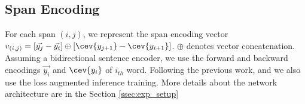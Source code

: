 \subsection{Span Encoding}
\label{ssec:phr:span}

For each span $(i,j)$, we represent the span encoding vector
$v_{(i,j)} = [\vec{y_{j}} - \vec{y_{i}}] \oplus [\cev{y_{j+1}} -
\cev{y_{i+1}}] $. $\oplus$ denotes vector concatenation. Assuming a
bidirectional sentence encoder, we use the forward and backward
encodings $\vec{y_{i}}$ and $\cev{y_{i}}$ of $i_{th}$ word. Following
the previous work, and we also use the loss augmented inference
training. More details about the network
architecture are in the Section \ref{ssec:exp_setup}


